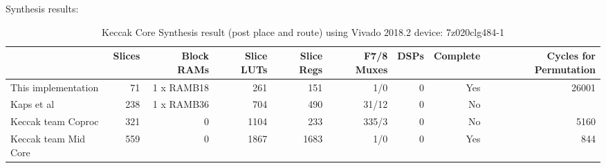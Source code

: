     Synthesis results:
    \begin{table}
        \begin{adjustbox}{width=1.2\textwidth,center=\textwidth}
            \begin{tabular}{l*{8}{r}}
                \rowcolor{DispositionColor!50}              %
                         {}            & Slices & Block RAMs &  Slice LUTs & Slice Regs & F7/8 Muxes & DSPs  & Complete & Cycles for Permutation \\ 
                \hline
                This implementation    & 71     & 1 x RAMB18 &  261        &    151         &      1/0    & 0       & Yes      & 26001  \\
                Kaps et al             & 238    & 1 x RAMB36 &  704        &    490         &      31/12  & 0       & No       &        \\
                Keccak team Coproc     & 321    & 0          &  1104       &    233         &     335/3   & 0       & No       & 5160   \\
                Keccak team Mid Core   &  559   & 0          &  1867       &    1683        &      1/0    & 0       & Yes      & 844    \\
                 \hline
            \end{tabular}
            \end{adjustbox}
        \caption{Keccak Core Synthesis result (post place and route) using Vivado 2018.2 device: 7z020clg484-1}
        \label{table:synth_area}
        \end{table}